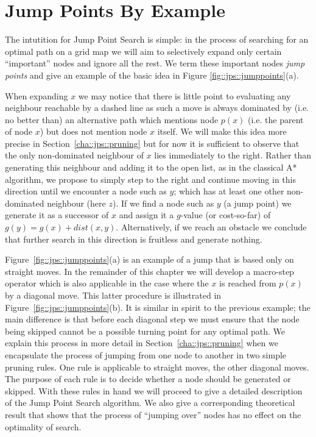 \section{Jump Points By Example}
\label{cha::jps::jumppoints}
The intutition for Jump Point Search is simple: in the process of searching
for an optimal path on a grid map we will aim to selectively expand only
certain ``important'' nodes and ignore all the rest.
We term these important nodes \emph{jump points} and give an example of the 
basic idea in Figure \ref{fig::jps::jumppoints}(a).

When expanding $x$ we may notice that there is little point to evaluating any
neighbour reachable by a dashed line as such a move is always dominated by
(i.e. no better than) an alternative path which mentions node $p(x)$ (i.e. the 
parent of node $x$) but does not mention node $x$ itself.
We will make this idea more precise in Section~\ref{cha::jps::pruning} but for
now it is sufficient to observe that the only non-dominated neighbour of $x$
lies immediately to the right.  Rather than generating this neighbour and
adding it to the open list, as in the classical A* algorithm, we propose to
simply step to the right and continue moving in this direction until we
encounter a node such as $y$; which has at least one other non-dominated
neighbour (here $z$).  If we find a node such as $y$ (a jump point) we
generate it as a successor of $x$ and assign it a $g$-value (or cost-so-far)
of $g(y) = g(x) + dist(x, y)$.  Alternatively, if we reach an obstacle we
conclude that further search in this direction is fruitless and generate
nothing.
\par
Figure~\ref{fig::jps::jumppoints}(a) is an example of a jump that is based
only on straight moves. In the remainder of this chapter we will develop  
a macro-step operator which is also applicable in the case where the $x$ is reached
from $p(x)$ by a diagonal move. This latter procedure is illustrated in 
Figure~\ref{fig::jps::jumppoints}(b). It is similar in spirit to the previous example;
the main difference is that before each diagonal step we must ensure that the node 
being skipped cannot be a possible turning point for any optimal path. 
We explain this process in more detail in Section~\ref{cha::jps::pruning} when we encapsulate
the process of jumping from one node to another in two simple pruning rules.
One rule is applicable to straight moves, the other diagonal moves.
The purpose of each rule is to decide whether a node should be generated or skipped. 
With these rules in hand we will proceed to give a detailed description of the Jump
Point Search algorithm. We also give a corresponding theoretical result that shows 
that the process of ``jumping over'' nodes has no effect on the optimality of search.


